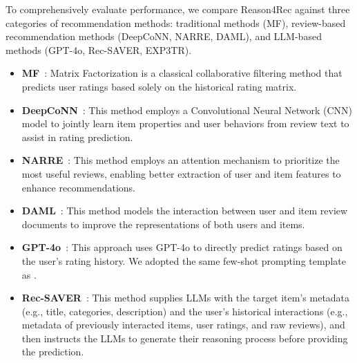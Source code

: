 To comprehensively evaluate performance, we compare Reason4Rec against three categories of recommendation methods: traditional methods (MF), review-based recommendation methods (DeepCoNN, NARRE, DAML), and LLM-based methods (GPT-4o, Rec-SAVER, EXP3TR).

\begin{itemize}[leftmargin=*]
    \item \textbf{MF}~\cite{MF}: Matrix Factorization is a classical collaborative filtering method that predicts user ratings based solely on the historical rating matrix.

    \item \textbf{DeepCoNN}~\cite{deepconn}: %
    This method employs a Convolutional Neural Network (CNN) model to jointly learn item properties and user behaviors from review text to assist in rating prediction.

    \item \textbf{NARRE}~\cite{NARRE}: 
    This method employs an attention mechanism to prioritize the most useful reviews, enabling better extraction of user and item features to enhance recommendations.

    \item \textbf{DAML}~\cite{DAML}: This method models the interaction between user and item review documents to improve the representations of both users and items.
    

    \item \textbf{GPT-4o}~\cite{chatgpt_CIKM}: This approach uses GPT-4o to directly predict ratings based on the user's rating history. We adopted the same few-shot prompting template as \cite{chatgpt_CIKM}.

    \item \textbf{Rec-SAVER}~\cite{ACL_findings}: This method supplies LLMs with the target item's metadata (e.g., title, categories, description) and the user's historical interactions (e.g., metadata of previously interacted items, user ratings, and raw reviews), and then instructs the LLMs to generate their reasoning process before providing the prediction.
    

\end{itemize}
